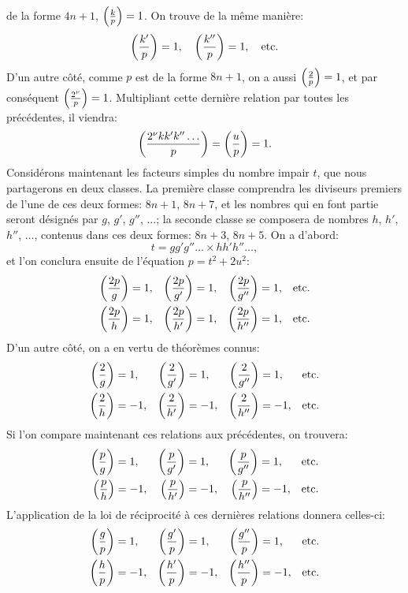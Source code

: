 \noindent
de la forme $4n+1$, $\left(\frac{k}{p}\right)=1$. On trouve de la même manière:
\[
\left(\frac{k'}{p}\right)=1,\quad \left(\frac{k''}{p}\right)=1,\quad\text{etc.}
\]
D'un autre côté, comme $p$ est de la forme $8n+1$, on a aussi $\left(\frac{2}{p}\right)=1$, et par
conséquent $\left(\frac{2^\nu}{p}\right)=1$. Multipliant cette dernière relation par toutes les précédentes,
il viendra:
\[
\left(\frac{2^\nu kk'k''\ldots}{p}\right)=\left(\frac{u}{p}\right)=1.
\]
Considérons maintenant les facteurs simples du nombre impair $t$, que nous partagerons
en deux classes. La première classe comprendra les diviseurs premiers
de l'une de ces deux formes: $8n+1$, $8n+7$, et les nombres qui en font partie
seront désignés par $g$, $g'$, $g''$, $\ldots$; la seconde classe se composera de nombres
$h$, $h'$, $h''$, $\ldots$, contenus dans ces deux formes: $8n+3$, $8n+5$. On a d'abord:
\[
t=gg'g''\ldots\times hh'h''\ldots,
\]
et l'on conclura ensuite de l'équation $p=t^2+2u^2$:
\[
\begin{aligned}
\left(\frac{2p}{g}\right)&=1, &\left(\frac{2p}{g'}\right)&=1, &\left(\frac{2p}{g''}\right)&=1, &\text{etc.}\\
\left(\frac{2p}{h}\right)&=1, &\left(\frac{2p}{h'}\right)&=1, &\left(\frac{2p}{h''}\right)&=1, &\text{etc.}
\end{aligned}
\]
D'un autre côté, on a en vertu de théorèmes connus:
\[
\begin{aligned}
\left(\frac{2}{g}\right)&=1, &\left(\frac{2}{g'}\right)&=1, &\left(\frac{2}{g''}\right)&=1, &\text{etc.}\\
\left(\frac{2}{h}\right)&=-1, &\left(\frac{2}{h'}\right)&=-1, &\left(\frac{2}{h''}\right)&=-1, &\text{etc.}
\end{aligned}
\]
Si l'on compare maintenant ces relations aux précédentes, on trouvera:
\[
\begin{aligned}
\left(\frac{p}{g}\right)&=1, &\left(\frac{p}{g'}\right)&=1, &\left(\frac{p}{g''}\right)&=1, &\text{etc.}\\
\left(\frac{p}{h}\right)&=-1, &\left(\frac{p}{h'}\right)&=-1, &\left(\frac{p}{h''}\right)&=-1, &\text{etc.}
\end{aligned}
\]
L'application de la loi de réciprocité à ces dernières relations donnera celles-ci:
\[
\begin{aligned}
\left(\frac{g}{p}\right)&=1, &\left(\frac{g'}{p}\right)&=1, &\left(\frac{g''}{p}\right)&=1, &\text{etc.}\\
\left(\frac{h}{p}\right)&=-1, &\left(\frac{h'}{p}\right)&=-1, &\left(\frac{h''}{p}\right)&=-1, &\text{etc.}
\end{aligned}
\]

